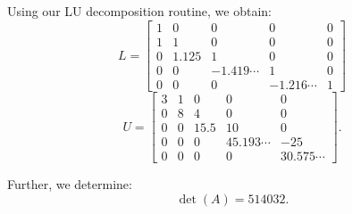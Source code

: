 \documentclass[12pt, a4paper]{article}
\begin{document}
  \subsection{}
  Using our LU decomposition routine, we obtain:
  \begin{equation}
    L = \begin{bmatrix}1 & 0 & 0 & 0 & 0 \\ 1 & 1 & 0 & 0 & 0 \\ 0 & 1.125 & 1 & 0 & 0 \\ 0 & 0 & -1.419\cdots & 1 & 0 \\ 0 & 0 & 0 & -1.216\cdots & 1\end{bmatrix}
  \end{equation}
  \begin{equation}
    U = \begin{bmatrix}3 & 1 & 0 & 0 & 0 \\ 0 & 8 & 4 & 0 & 0 \\ 0 & 0 & 15.5 & 10 & 0 \\ 0 & 0 & 0 & 45.193\cdots & -25 \\ 0 & 0 & 0 & 0 & 30.575\cdots\end{bmatrix}.
  \end{equation}

  Further, we determine:
  \begin{equation}
    \det(A) = 514032.
  \end{equation}
\end{document}
